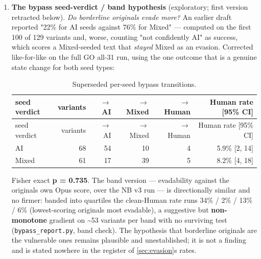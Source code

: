 \begin{enumerate}
  than uniformly, 0 Human). Combined they produced \textbf{1 reversal in 120
  variants (0.8\%)}; keeping them in was the old pooled \textbf{8.5\%} per-variant
  figure, which averaged two failed samplings into the rate. The \cref{sec:evasion} rates
  (per-variant 11.1\%, per-target 22.5\%) are the two final searches --- NB v3
  contrastive and GO all-31 uniform --- which is also the subset the per-target
  figure always used. \texttt{bypass\_report.py} prints both groups.
\item
  \textbf{The bypass seed-verdict / band hypothesis} (exploratory; first
  version retracted below). \emph{Do borderline originals evade more?} An
  earlier draft reported "22\% for AI seeds against 76\% for Mixed" --- computed
  on the first 100 of 129 variants and, worse, counting "not confidently AI"
  as success, which scores a Mixed-seeded text that \emph{stayed} Mixed as an
  evasion. Corrected like-for-like on the full GO all-31 run, using the one
  outcome that is a genuine state change for both seed types:

  \begingroup\small
\begin{longtable}[]{@{}lrrrrr@{}}
\caption{Superseded per-seed bypass transitions.}\label{tab:superseded-bypass}\\
  \toprule\noalign{}
  seed verdict & variants & \(\rightarrow\) AI & \(\rightarrow\) Mixed & \(\rightarrow\) Human & Human rate {[}95\% CI{]} \\
  \midrule\noalign{}
\endfirsthead
  \toprule\noalign{}
  seed verdict & variants & \(\rightarrow\) AI & \(\rightarrow\) Mixed & \(\rightarrow\) Human & Human rate {[}95\% CI{]} \\
  \midrule\noalign{}
\endhead
  \bottomrule\noalign{}
  \endlastfoot
  AI & 68 & 54 & 10 & 4 & 5.9\% {[}2, 14{]} \\
  Mixed & 61 & 17 & 39 & 5 & 8.2\% {[}4, 18{]} \\
  \end{longtable}
\endgroup

  Fisher exact \textbf{p = 0.735}. The band version --- evadability against the
  original\textquotesingle s own Opus score, over the NB v3 run --- is directionally similar
  and no firmer: banded into quartiles the clean-Human rate runs 34\% / 2\% /
  13\% / 6\% (lowest-scoring originals most evadable), a suggestive but
  \textbf{non-monotone} gradient on \textasciitilde53 variants per band with no surviving test
  (\texttt{bypass\_report.py}, band check). The hypothesis that borderline originals
  are the vulnerable ones remains plausible and unestablished; it is not a
  finding and is stated nowhere in the register of \cref{sec:evasion}\textquotesingle s rates.
\end{enumerate}

